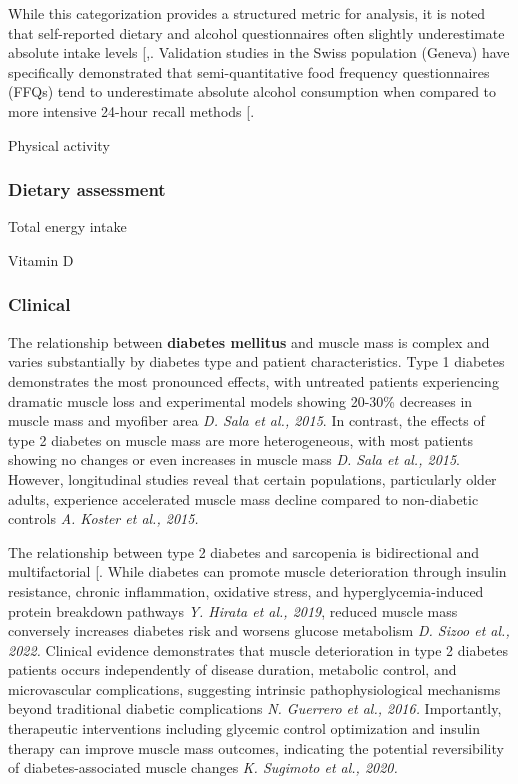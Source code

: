 \documentclass[
  11pt,
]{article}
\begin{document}
While this categorization provides a structured metric for analysis, it
is noted that self-reported dietary and alcohol questionnaires often
slightly underestimate absolute intake levels
{[},\citeproc{ref-morabia1994}{6}{]}.
Validation studies in the Swiss population (Geneva) have specifically
demonstrated that semi-quantitative food frequency questionnaires (FFQs)
tend to underestimate absolute alcohol consumption when compared to more
intensive 24-hour recall methods {[}\citeproc{ref-morabia1994}{6}{]}.

Physical activity

\subsubsection{Dietary assessment}\label{dietary-assessment}

Total energy intake

Vitamin D

\subsubsection{Clinical}\label{clinical}

The relationship between \textbf{diabetes mellitus} and muscle mass is
complex and varies substantially by diabetes type and patient
characteristics. Type 1 diabetes demonstrates the most pronounced
effects, with untreated patients experiencing dramatic muscle loss and
experimental models showing 20-30\% decreases in muscle mass and
myofiber area \emph{D. Sala et al., 2015}. In contrast, the effects of
type 2 diabetes on muscle mass are more heterogeneous, with most
patients showing no changes or even increases in muscle mass \emph{D.
Sala et al., 2015}. However, longitudinal studies reveal that certain
populations, particularly older adults, experience accelerated muscle
mass decline compared to non-diabetic controls \emph{A. Koster et al.,
2015.}

The relationship between type 2 diabetes and sarcopenia is bidirectional
and multifactorial {[}\citeproc{ref-chen2023}{7}{]}. While diabetes can
promote muscle deterioration through insulin resistance, chronic
inflammation, oxidative stress, and hyperglycemia-induced protein
breakdown pathways \emph{Y. Hirata et al., 2019}, reduced muscle mass
conversely increases diabetes risk and worsens glucose metabolism
\emph{D. Sizoo et al., 2022.} Clinical evidence demonstrates that muscle
deterioration in type 2 diabetes patients occurs independently of
disease duration, metabolic control, and microvascular complications,
suggesting intrinsic pathophysiological mechanisms beyond traditional
diabetic complications \emph{N. Guerrero et al., 2016.} Importantly,
therapeutic interventions including glycemic control optimization and
insulin therapy can improve muscle mass outcomes, indicating the
potential reversibility of diabetes-associated muscle changes \emph{K.
Sugimoto et al., 2020.}
\end{document}
